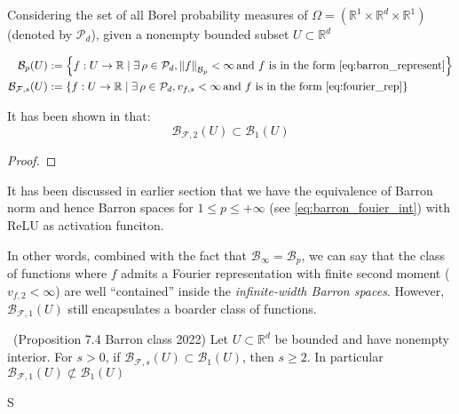 Considering the set of all Borel probability measures of $\Omega = (\mathbb{R}^1 \times \mathbb{R}^d \times \mathbb{R}^1)$ (denoted by $\mathcal{P}_d$), given a nonempty bounded subset $U \subset \mathbb{R}^d$

\begin{align*}
    \mathcal{B}_{p}(U) &:= \left\{f: U \to \mathbb{R} \mid \exists\, \rho \in \mathcal{P}_d, \left\lVert f\right\rVert_{\mathcal{B}_p} < \infty \, \text{and $f$ is in the form \eqref{eq:barron_represent}}\right\} \\
    \mathcal{B}_{\mathcal{F}, s}(U) &:= \left\{f: U \to \mathbb{R} \mid \exists\, \rho \in \mathcal{P}_d, v_{f, s} < \infty \, \text{and $f$ is in the form \eqref{eq:fourier_rep}}\right\}
\end{align*}


It has been shown in \TOCITE that:
\begin{equation*}
    \mathcal{B}_{\mathcal{F},2}(U) \subset \mathcal{B}_{1}(U)
\end{equation*}

\begin{proof}
    
\end{proof}

It has been discussed in earlier section that we have the equivalence of Barron norm and hence Barron spaces for $1 \leq p\leq +\infty$ (see \eqref{eq:barron_fouier_int}) with ReLU as activation funciton.

In other words, combined with the fact that $\mathcal{B}_{\infty} = \mathcal{B}_p$, we can say that
the class of functions where $f$ admits a Fourier representation with finite second moment ($v_{f, 2} < \infty$) are well ``contained'' inside the \textit{infinite-width Barron spaces}. 
However, $\mathcal{B}_{\mathcal{F}, 1}(U)$ still encapsulates a boarder class of functions.

\begin{lemma}~\TOCITE(Proposition 7.4 {Barron class 2022})
    Let $U \subset \mathbb{R}^d$ be bounded and have nonempty interior.
    For $s>0$, if $\mathcal{B}_{\mathcal{F},s}(U) \subset \mathcal{B}_{1}(U)$, then $s \geq 2$. In particular 
    $\mathcal{B}_{\mathcal{F},1}(U) \not\subset \mathcal{B}_{1}(U)$
\end{lemma}


S




